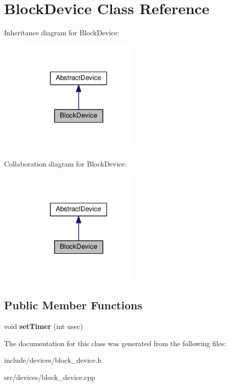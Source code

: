 \hypertarget{classBlockDevice}{\section{\-Block\-Device \-Class \-Reference}
\label{db/d6d/classBlockDevice}
}


\-Inheritance diagram for \-Block\-Device\-:\nopagebreak
\begin{figure}[H]
\begin{center}
\leavevmode
\includegraphics[width=162pt]{d0/d85/classBlockDevice__inherit__graph}
\end{center}
\end{figure}


\-Collaboration diagram for \-Block\-Device\-:\nopagebreak
\begin{figure}[H]
\begin{center}
\leavevmode
\includegraphics[width=162pt]{d4/df3/classBlockDevice__coll__graph}
\end{center}
\end{figure}
\subsection*{\-Public \-Member \-Functions}
\begin{DoxyCompactItemize}
\item 
\hypertarget{classBlockDevice_a7ff2350ac492e4a73a4b59f9a6bbe629}{void {\bfseries set\-Timer} (int usec)}\label{db/d6d/classBlockDevice_a7ff2350ac492e4a73a4b59f9a6bbe629}

\end{DoxyCompactItemize}


\-The documentation for this class was generated from the following files\-:\begin{DoxyCompactItemize}
\item 
include/devices/block\-\_\-device.\-h\item 
src/devices/block\-\_\-device.\-cpp\end{DoxyCompactItemize}
